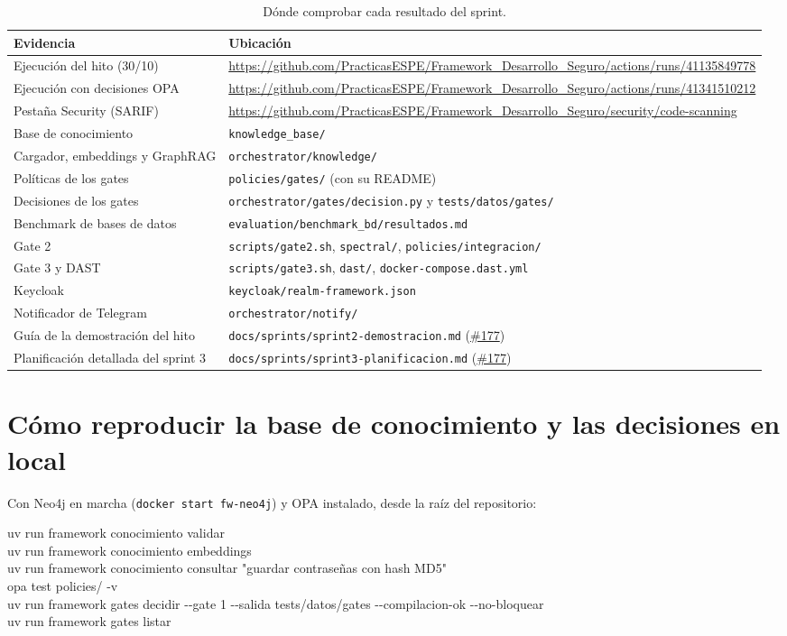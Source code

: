 \documentclass[11pt,a4paper]{report}
\newcommand{\pr}[1]{\href{https://github.com/PracticasESPE/Framework_Desarrollo_Seguro/pull/#1}{\##1}}
\begin{document}
\begin{table}[H]
\centering
\caption{Dónde comprobar cada resultado del sprint.}
\begin{tabularx}{\textwidth}{@{}P{4.0cm}>{\raggedright\arraybackslash\small}X@{}}
\toprule
\textbf{Evidencia} & \textbf{Ubicación}\\
\midrule
Ejecución del hito (30/10) & \url{https://github.com/PracticasESPE/Framework_Desarrollo_Seguro/actions/runs/41135849778}\\
Ejecución con decisiones OPA & \url{https://github.com/PracticasESPE/Framework_Desarrollo_Seguro/actions/runs/41341510212}\\
Pestaña Security (SARIF) & \url{https://github.com/PracticasESPE/Framework_Desarrollo_Seguro/security/code-scanning}\\
Base de conocimiento & \texttt{knowledge\_base/}\\
Cargador, embeddings y GraphRAG & \texttt{orchestrator/knowledge/}\\
Políticas de los gates & \texttt{policies/gates/} (con su README)\\
Decisiones de los gates & \texttt{orchestrator/gates/decision.py} y \texttt{tests/datos/gates/}\\
Benchmark de bases de datos & \texttt{evaluation/benchmark\_bd/resultados.md}\\
Gate 2 & \texttt{scripts/gate2.sh}, \texttt{spectral/}, \texttt{policies/integracion/}\\
Gate 3 y DAST & \texttt{scripts/gate3.sh}, \texttt{dast/}, \texttt{docker-compose.dast.yml}\\
Keycloak & \texttt{keycloak/realm-framework.json}\\
Notificador de Telegram & \texttt{orchestrator/notify/}\\
Guía de la demostración del hito & \texttt{docs/sprints/sprint2-demostracion.md} (\pr{177})\\
Planificación detallada del sprint 3 & \texttt{docs/sprints/sprint3-planificacion.md} (\pr{177})\\
\bottomrule
\end{tabularx}
\end{table}

\section*{Cómo reproducir la base de conocimiento y las decisiones en local}
Con Neo4j en marcha (\texttt{docker start fw-neo4j}) y OPA instalado, desde la raíz del
repositorio:

\begin{tcolorbox}[colback=white,colframe=grisfw,boxrule=0.4pt,arc=1mm,left=2mm]
\small\ttfamily
uv run framework conocimiento validar\\
uv run framework conocimiento embeddings\\
uv run framework conocimiento consultar "guardar contraseñas con hash MD5"\\
opa test policies/ -v\\
uv run framework gates decidir -{}-gate 1 -{}-salida tests/datos/gates -{}-compilacion-ok -{}-no-bloquear\\
uv run framework gates listar
\end{tcolorbox}
\end{document}
